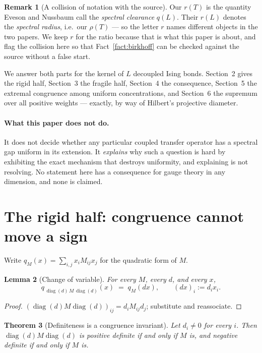 \documentclass[11pt,a4paper]{article}
\theoremstyle{plain}
\newtheorem{theorem}{Theorem}[section]
\newtheorem{lemma}[theorem]{Lemma}
\theoremstyle{definition}
\newtheorem{remark}[theorem]{Remark}
\newcommand{\diag}{\operatorname{diag}}
\begin{document}
\begin{remark}[A collision of notation with the source]\label{rem:notation}
Our $r(T)$ is the quantity Eveson and Nussbaum call the \emph{spectral
clearance} $q(L)$. Their $r(L)$ denotes the \emph{spectral radius}, i.e.\ our
$\rho(T)$ --- so the letter $r$ names different objects in the two papers. We
keep $r$ for the ratio because that is what this paper is about, and flag the
collision here so that Fact~\ref{fact:birkhoff} can be checked against the
source without a false start.
\end{remark}

We answer both parts for the kernel of $L$ decoupled Ising bonds. Section~2
gives the rigid half, Section~3 the fragile half, Section~4 the consequence,
Section~5 the extremal congruence among uniform concentrations, and Section~6
the supremum over all positive weights --- exactly, by way of Hilbert's
projective diameter.

\paragraph{What this paper does not do.} It does not decide whether any
particular coupled transfer operator has a spectral gap uniform in its
extension. It \emph{explains} why such a question is hard by exhibiting the
exact mechanism that destroys uniformity, and explaining is not resolving. No
statement here has a consequence for gauge theory in any dimension, and none is
claimed.

\section{The rigid half: congruence cannot move a sign}

Write $q_M(x)=\sum_{i,j} x_i M_{ij} x_j$ for the quadratic form of $M$.

\begin{lemma}[Change of variable]\label{lem:change}
For every $M$, every $d$, and every $x$,
\[
  q_{\,\diag(d)\,M\,\diag(d)}(x) \;=\; q_M(dx),
  \qquad (dx)_i := d_i x_i .
\]
\end{lemma}

\begin{proof}
$(\diag(d)M\diag(d))_{ij} = d_i M_{ij} d_j$; substitute and reassociate.
\end{proof}

\begin{theorem}[Definiteness is a congruence invariant]\label{thm:rigid}
Let $d_i \neq 0$ for every $i$. Then $\diag(d)M\diag(d)$ is positive definite
if and only if $M$ is, and negative definite if and only if $M$ is.
\end{theorem}
\end{document}
